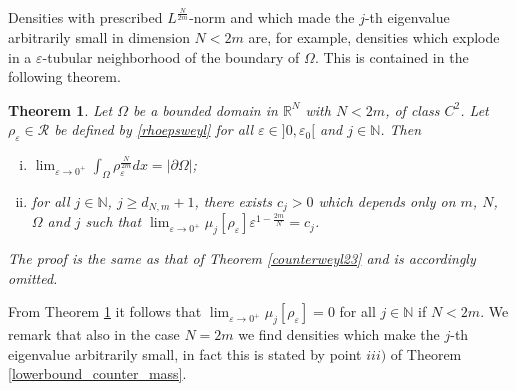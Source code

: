 \documentclass[11pt,a4paper]{amsart}
\numberwithin{equation}{section}
\newtheorem{thm}[equation]{Theorem}
\begin{document}
Densities with prescribed $L^{\frac{N}{2m}}$-norm and which made the $j$-th eigenvalue arbitrarily small in dimension $N<2m$ are, for example, densities which explode in a $\varepsilon$-tubular neighborhood of the boundary of $\Omega$. This is contained in the following theorem.
\begin{thm}\label{lowerbound_counter_weyl}
Let $\Omega$ be a bounded domain in $\mathbb R^N$ with $N<2m$, of class $C^2$. Let $\rho_{\varepsilon}\in\mathcal R$ be defined by \eqref{rhoepsweyl} for all $\varepsilon\in]0,\varepsilon_0[$ and $j\in\mathbb N$. Then
\begin{enumerate}[i)]
\item $\lim_{\varepsilon\rightarrow 0^+}\int_{\Omega}\rho_{\varepsilon}^{\frac{N}{2m}}dx=|\partial\Omega|$;
\item for all $j\in\mathbb N$, $j\geq d_{N,m}+1$, there exists $c_j>0$ which depends only on $m$, $N$, $\Omega$ and $j$ such that $\lim_{\varepsilon\rightarrow 0^+}\mu_j[\rho_{\varepsilon}]\varepsilon^{1-\frac{2m}{N}}=c_j$.
\end{enumerate}
\proof
The proof is the same as that of Theorem \ref{counterweyl23} and is accordingly omitted.
\endproof
\end{thm}

From Theorem \ref{lowerbound_counter_weyl} it follows that $\lim_{\varepsilon\rightarrow 0^+}\mu_j[\rho_{\varepsilon}]=0$ for all $j\in\mathbb N$ if $N<2m$. We remark that also in the case $N=2m$ we find densities which make the $j$-th eigenvalue arbitrarily small, in fact this is stated by point $iii)$ of Theorem \ref{lowerbound_counter_mass}.








\end{document}
